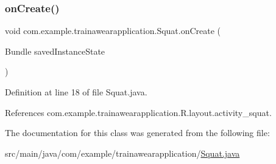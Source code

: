 \subsubsection{\texorpdfstring{onCreate()}{onCreate()}}
{\footnotesize\ttfamily void com.\+example.\+trainawearapplication.\+Squat.\+on\+Create (\begin{DoxyParamCaption}\item[{Bundle}]{saved\+Instance\+State }\end{DoxyParamCaption})\hspace{0.3cm}{\ttfamily [protected]}}



Definition at line 18 of file Squat.\+java.


\begin{DoxyCode}{0}

\end{DoxyCode}


References com.\+example.\+trainawearapplication.\+R.\+layout.\+activity\+\_\+squat.



The documentation for this class was generated from the following file\+:\begin{DoxyCompactItemize}
\item 
src/main/java/com/example/trainawearapplication/\mbox{\hyperlink{_squat_8java}{Squat.\+java}}\end{DoxyCompactItemize}
